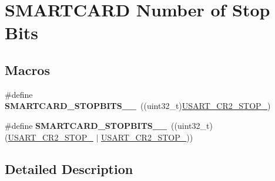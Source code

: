 \hypertarget{group___s_m_a_r_t_c_a_r_d___stop___bits}{}\section{S\+M\+A\+R\+T\+C\+A\+RD Number of Stop Bits}
\label{group___s_m_a_r_t_c_a_r_d___stop___bits}
\subsection*{Macros}
\begin{DoxyCompactItemize}
\item 
\#define {\bfseries S\+M\+A\+R\+T\+C\+A\+R\+D\+\_\+\+S\+T\+O\+P\+B\+I\+T\+S\+\_\+\_}~((uint32\+\_\+t)\hyperlink{group___peripheral___registers___bits___definition_gaee6ee01c6e5325b378b2209ef20d0a61}{U\+S\+A\+R\+T\+\_\+\+C\+R2\+\_\+\+S\+T\+O\+P\+\_})\hypertarget{group___s_m_a_r_t_c_a_r_d___stop___bits_gacb1f23b1dd63c60d9823d1ec65475ae0}{}\label{group___s_m_a_r_t_c_a_r_d___stop___bits_gacb1f23b1dd63c60d9823d1ec65475ae0}

\item 
\#define {\bfseries S\+M\+A\+R\+T\+C\+A\+R\+D\+\_\+\+S\+T\+O\+P\+B\+I\+T\+S\+\_\+\_}~((uint32\+\_\+t)(\hyperlink{group___peripheral___registers___bits___definition_gaee6ee01c6e5325b378b2209ef20d0a61}{U\+S\+A\+R\+T\+\_\+\+C\+R2\+\_\+\+S\+T\+O\+P\+\_} $\vert$ \hyperlink{group___peripheral___registers___bits___definition_ga2b24d14f0e5d1c76c878b08aad44d02b}{U\+S\+A\+R\+T\+\_\+\+C\+R2\+\_\+\+S\+T\+O\+P\+\_}))\hypertarget{group___s_m_a_r_t_c_a_r_d___stop___bits_ga60cf2b59a8e70d1039e8ce1dcdb7c97b}{}\label{group___s_m_a_r_t_c_a_r_d___stop___bits_ga60cf2b59a8e70d1039e8ce1dcdb7c97b}

\end{DoxyCompactItemize}


\subsection{Detailed Description}
